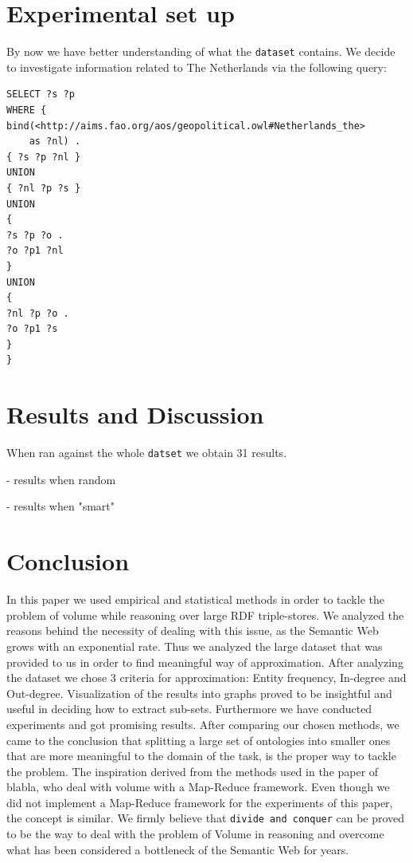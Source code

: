 \documentclass[runningheads,a4paper]{../../StyleFiles/llncs}
\begin{document}
\section{Experimental set up}
By now we have better understanding of what the \texttt{dataset} contains. We decide to investigate information related to The Netherlands via the following query:

\begin{lstlisting}[captionpos=b, caption=SPARQL query for calculating out degree of entities, label=lst:sparql, basicstyle=\ttfamily\small,frame=bt]
SELECT ?s ?p
WHERE {
bind(<http://aims.fao.org/aos/geopolitical.owl#Netherlands_the> 
	as ?nl) .
{ ?s ?p ?nl }
UNION
{ ?nl ?p ?s }
UNION
{
?s ?p ?o .
?o ?p1 ?nl
}
UNION
{
?nl ?p ?o .
?o ?p1 ?s
}
}
\end{lstlisting}

\section{Results and Discussion}
When ran against the whole \texttt{datset} we obtain 31 results. 

- results when random 

- results when "smart"

\section{Conclusion}
In this paper we used empirical and statistical methods in order to tackle the problem of volume while reasoning over large RDF triple-stores. We analyzed the reasons behind the necessity of dealing with this issue, as the Semantic Web grows with an exponential rate. Thus we analyzed the large dataset that was provided to us in order to find meaningful way of approximation. After analyzing the dataset we chose 3 criteria for approximation: Entity frequency, In-degree and Out-degree. Visualization of the results into graphs proved to be insightful and useful in deciding how to extract sub-sets. 
Furthermore we have conducted experiments and got promising results. After comparing our chosen methods, we came to the conclusion that splitting a large set of ontologies into smaller ones that are more meaningful to the domain of the task, is the proper way to tackle the problem. The inspiration derived from the methods used in the paper of blabla, who deal with volume with a Map-Reduce framework. Even though we did not implement a Map-Reduce framework for the experiments of this paper, the concept is similar. 
We firmly believe that \texttt{divide and conquer}  can be proved to be the way to deal with the problem of Volume in reasoning and overcome what has been considered a bottleneck of the Semantic Web for years.



\end{document}

